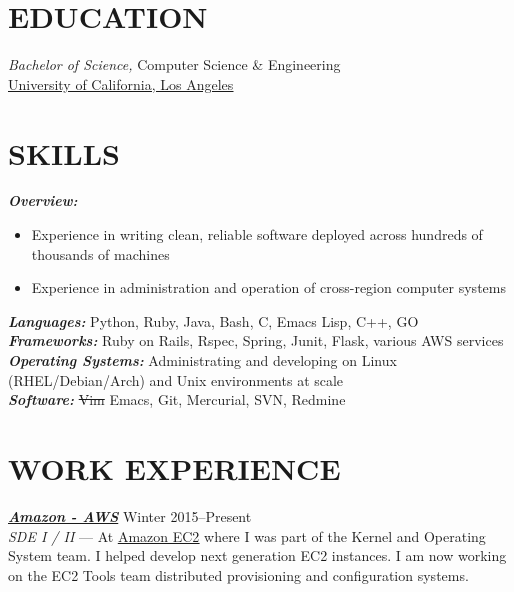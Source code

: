 \documentclass[line,letterpaper]{resume}
\begin{document}
\address{\ }
\address{\ }


\begin{resume}
    \vspace{-24pt}
    \section{\uppercase{Education}} {\sl Bachelor of Science,} \/
    Computer Science \& Engineering \\
    \underline{\href{http://cs.ucla.edu}{University of California, Los Angeles}}\\
    \vspace{-16pt}

 \section{\uppercase{Skills}}
    {\sl\textbf{Overview:}}\/
	\begin{itemize}
		\item Experience in writing clean, reliable software deployed across hundreds of thousands of machines
		\item Experience in administration and operation of cross-region computer systems
	\end{itemize}
    {\sl\textbf{Languages:}}\/
    Python, Ruby, Java, Bash, C, Emacs Lisp, C++, GO \\
    {\sl\textbf{Frameworks:}}\/
	Ruby on Rails, Rspec, Spring, Junit, Flask, various AWS services\\
    {\sl\textbf{Operating Systems:}}\/
	Administrating and developing on Linux (RHEL/Debian/Arch) and Unix environments at scale\\
    {\sl\textbf{Software:}}\/
	\sout{Vim} Emacs, Git, Mercurial, SVN, Redmine
    \vspace{-6pt}

	\section{\uppercase{Work Experience}}

	{\sl\textbf{\href{https://aws.amazon.com/}{Amazon - AWS}}} \hfill Winter 2015--Present\\
    \emph{SDE I / II } --- At \underline{\href{http://aws.amazon.com/ec2}
	{Amazon EC2}} where I was part of the Kernel and Operating System team. I helped
	develop next generation EC2 instances. I am now working on the EC2 Tools team
    distributed provisioning and configuration systems.


\end{resume}
\end{document}
